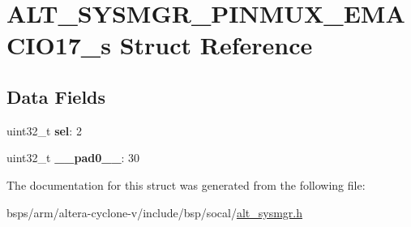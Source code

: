 \hypertarget{structALT__SYSMGR__PINMUX__EMACIO17__s}{}\section{A\+L\+T\+\_\+\+S\+Y\+S\+M\+G\+R\+\_\+\+P\+I\+N\+M\+U\+X\+\_\+\+E\+M\+A\+C\+I\+O17\+\_\+s Struct Reference}
\label{structALT__SYSMGR__PINMUX__EMACIO17__s}
\subsection*{Data Fields}
\begin{DoxyCompactItemize}
\item 
\mbox{\label{structALT__SYSMGR__PINMUX__EMACIO17__s_acb56c56a45296542766e2d821f168aac}} 
uint32\+\_\+t {\bfseries sel}\+: 2
\item 
\mbox{\label{structALT__SYSMGR__PINMUX__EMACIO17__s_a8f3eaebae53a0c002b1fc920d0b990ca}} 
uint32\+\_\+t {\bfseries \+\_\+\+\_\+pad0\+\_\+\+\_\+}\+: 30
\end{DoxyCompactItemize}


The documentation for this struct was generated from the following file\+:\begin{DoxyCompactItemize}
\item 
bsps/arm/altera-\/cyclone-\/v/include/bsp/socal/\mbox{\hyperlink{alt__sysmgr_8h}{alt\+\_\+sysmgr.\+h}}\end{DoxyCompactItemize}
